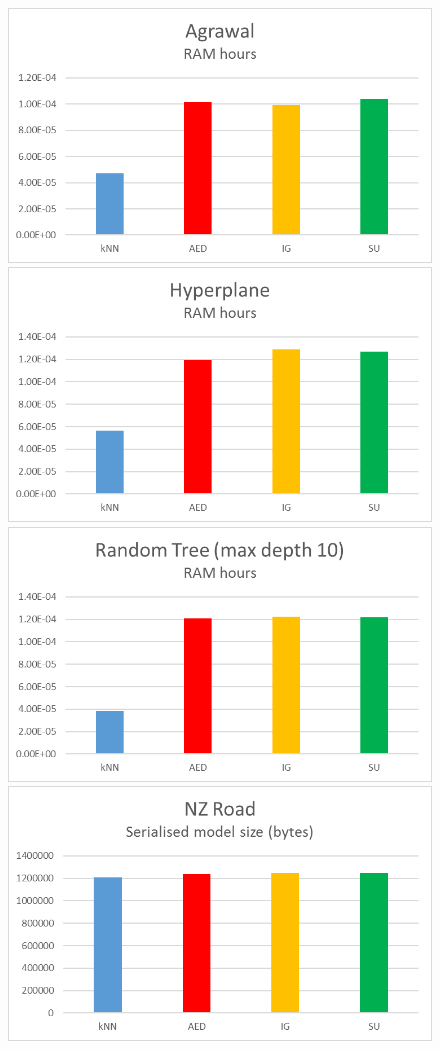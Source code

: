 \begin{figure}[hp]
\includegraphics[scale=0.17]{Graphs/Agrawal/mem}
\includegraphics[scale=0.17]{Graphs/Hyperplane/mem}
\includegraphics[scale=0.17]{Graphs/TreeD10/mem}
\includegraphics[scale=0.17]{Graphs/NZRoad/mem}

\end{figure}
